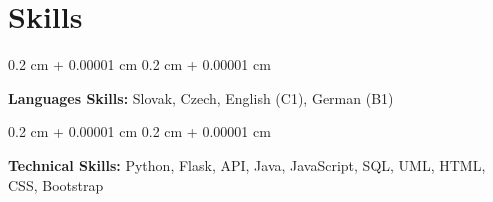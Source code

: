 \documentclass[10pt, letterpaper]{article}
\newenvironment{onecolentry}{
    \begin{adjustwidth}{
        0.2 cm + 0.00001 cm
    }{
        0.2 cm + 0.00001 cm
    }
}{
    \end{adjustwidth}
} %
\begin{document}
    
    \section{Skills}



        
        \begin{onecolentry}
            \textbf{Languages Skills:} Slovak, Czech, English (C1), German (B1)
        \end{onecolentry}

        \vspace{0.1 cm}

        \begin{onecolentry}
            \textbf{Technical Skills:} Python, Flask, API, Java, JavaScript, SQL, UML, HTML, CSS, Bootstrap
        \end{onecolentry}


    
\end{document}
